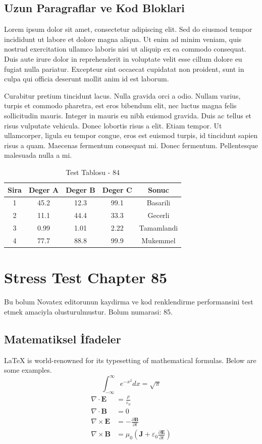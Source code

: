 \documentclass[12pt,a4paper]{article}
\begin{document}
\subsection{Uzun Paragraflar ve Kod Bloklari}
Lorem ipsum dolor sit amet, consectetur adipiscing elit. Sed do eiusmod tempor incididunt ut labore et dolore magna aliqua. Ut enim ad minim veniam, quis nostrud exercitation ullamco laboris nisi ut aliquip ex ea commodo consequat. Duis aute irure dolor in reprehenderit in voluptate velit esse cillum dolore eu fugiat nulla pariatur. Excepteur sint occaecat cupidatat non proident, sunt in culpa qui officia deserunt mollit anim id est laborum.

Curabitur pretium tincidunt lacus. Nulla gravida orci a odio. Nullam varius, turpis et commodo pharetra, est eros bibendum elit, nec luctus magna felis sollicitudin mauris. Integer in mauris eu nibh euismod gravida. Duis ac tellus et risus vulputate vehicula. Donec lobortis risus a elit. Etiam tempor. Ut ullamcorper, ligula eu tempor congue, eros est euismod turpis, id tincidunt sapien risus a quam. Maecenas fermentum consequat mi. Donec fermentum. Pellentesque malesuada nulla a mi.

\begin{table}[h!]
\centering
\begin{tabular}{|c|c|c|c|c|}
\hline
\textbf{Sira} & \textbf{Deger A} & \textbf{Deger B} & \textbf{Deger C} & \textbf{Sonuc} \\
\hline
1 & 45.2 & 12.3 & 99.1 & Basarili \\
2 & 11.1 & 44.4 & 33.3 & Gecerli \\
3 & 0.99 & 1.01 & 2.22 & Tamamlandi \\
4 & 77.7 & 88.8 & 99.9 & Mukemmel \\
\hline
\end{tabular}
\caption{Test Tablosu - 84}
\end{table}

\newpage
\section{Stress Test Chapter 85}
Bu bolum Novatex editorunun kaydirma ve kod renklendirme performansini test etmek amaciyla olusturulmustur. Bolum numarasi: 85.

\subsection{Matematiksel İfadeler}
\LaTeX{} is world-renowned for its typesetting of mathematical formulas. Below are some examples.
\begin{equation}
\int_{-\infty}^{\infty} e^{-x^2} dx = \sqrt{\pi}
\end{equation}
\begin{align}
\nabla \cdot \mathbf{E} &= \frac{\rho}{\varepsilon_0} \\
\nabla \cdot \mathbf{B} &= 0 \\
\nabla \times \mathbf{E} &= -\frac{\partial \mathbf{B}}{\partial t} \\
\nabla \times \mathbf{B} &= \mu_0\left(\mathbf{J} + \varepsilon_0 \frac{\partial \mathbf{E}}{\partial t}\right)
\end{align}
\end{document}
